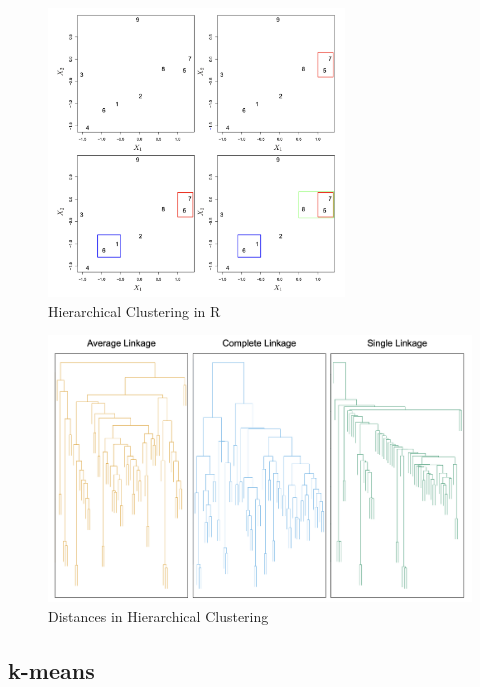 \begin{center}
    \begin{figure}[H]
        \centering
        \includegraphics[width=0.7\textwidth]{assets/fig36.png}
        \caption{Hierarchical Clustering in R}
    \end{figure}
\end{center}

\begin{center}
    \begin{figure}[H]
        \centering
        \includegraphics[width=1\textwidth]{assets/fig37.png}
        \caption{Distances in Hierarchical Clustering}
    \end{figure}
\end{center}

\subsection{k-means}


